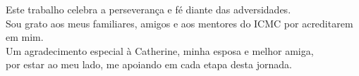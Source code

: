 Este trabalho celebra a perseverança e fé diante das adversidades. \\
Sou grato aos meus familiares, amigos e aos mentores do ICMC por acreditarem em mim. \\
Um agradecimento especial à Catherine, minha esposa e melhor amiga, \\
por estar ao meu lado, me apoiando em cada etapa desta jornada.




